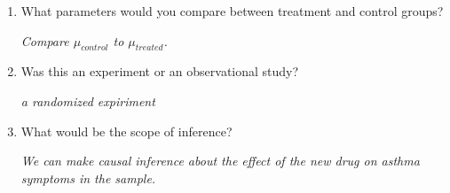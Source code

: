 \begin{enumerate}
\begin{enumerate}
    \item What parameters would you compare between treatment and
      control groups?
\begin{students}
        \vfill
\end{students}
\begin{key}
 {\it Compare $\mu_{control}$ to $\mu_{treated}$.}
\end{key}

    \item Was this  an experiment or an observational study? 
\begin{students}
        \vfill
\end{students}
\begin{key}
 {\it a randomized expiriment}
\end{key}

    \item What would be the scope of inference?
 \begin{students}
        \vfill
\end{students}
\begin{key}
 {\it We can make causal inference about the effect of the new drug on
 asthma symptoms in the sample.}
\end{key}


\end{enumerate}
\end{enumerate}
